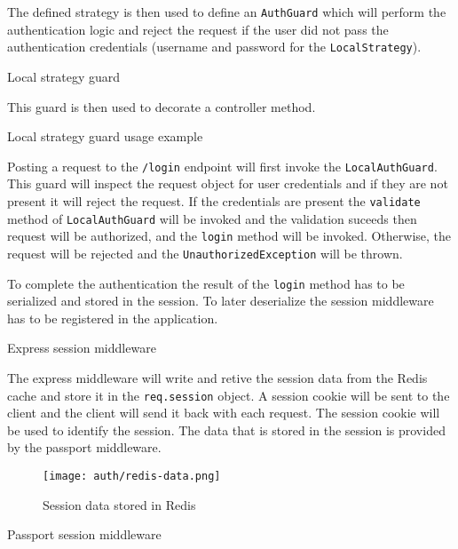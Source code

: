\documentclass[../main.tex]{subfiles}
\begin{document}
The defined strategy is then used to define an \texttt{AuthGuard} which will perform the authentication logic and reject the request if the user
did not pass the authentication credentials (username and password for the \texttt{LocalStrategy}).

\begin{listing}[H]
  \caption{Local strategy guard}
\end{listing}

This guard is then used to decorate a controller method.

\begin{listing}[H]
  \caption{Local strategy guard usage example}
  \label{code:local-guard-usage}
\end{listing}

Posting a request to the \texttt{/login} endpoint will first invoke the \texttt{LocalAuthGuard}.
This guard will inspect the request object for user credentials and if they are not present it will reject the request.
If the credentials are present the \texttt{validate} method of \texttt{LocalAuthGuard} will be invoked and the validation suceeds then request will be authorized, and the
\texttt{login} method will be invoked. Otherwise, the request will be rejected and the \texttt{UnauthorizedException} will be thrown.

To complete the authentication the result of the \texttt{login} method has to be serialized and stored in the session.
To later deserialize the session middleware has to be registered in the application.

\begin{listing}[H]
  \caption{Express session middleware}
\end{listing}

The express middleware will write and retive the session data from the Redis cache and store it in the \texttt{req.session} object.
A session cookie will be sent to the client and the client will send it back with each request. The session cookie will be used to identify the session.
The data that is stored in the session is provided by the passport middleware.

\begin{figure}[H]
  \centering
  \texttt{[image: auth/redis-data.png]}
  \caption{Session data stored in Redis}
\end{figure}


\begin{listing}[H]
  \caption{Passport session middleware}
\end{listing}
\end{document}
